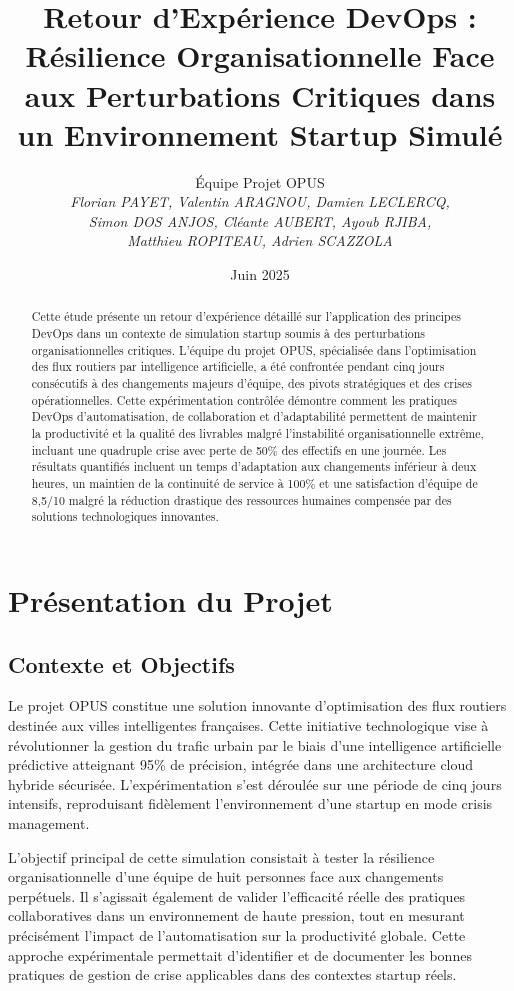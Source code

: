 \documentclass[12pt,a4paper]{article}
\title{Retour d'Expérience DevOps : Résilience Organisationnelle Face aux Perturbations Critiques dans un Environnement Startup Simulé}
\author{
Équipe Projet OPUS \\
\textit{Florian PAYET, Valentin ARAGNOU, Damien LECLERCQ,} \\
\textit{Simon DOS ANJOS, Cléante AUBERT, Ayoub RJIBA,} \\
\textit{Matthieu ROPITEAU, Adrien SCAZZOLA}
}
\date{Juin 2025}
\begin{document}
\maketitle

\begin{abstract}
Cette étude présente un retour d'expérience détaillé sur l'application des principes DevOps dans un contexte de simulation startup soumis à des perturbations organisationnelles critiques. L'équipe du projet OPUS, spécialisée dans l'optimisation des flux routiers par intelligence artificielle, a été confrontée pendant cinq jours consécutifs à des changements majeurs d'équipe, des pivots stratégiques et des crises opérationnelles. Cette expérimentation contrôlée démontre comment les pratiques DevOps d'automatisation, de collaboration et d'adaptabilité permettent de maintenir la productivité et la qualité des livrables malgré l'instabilité organisationnelle extrême, incluant une quadruple crise avec perte de 50\% des effectifs en une journée. Les résultats quantifiés incluent un temps d'adaptation aux changements inférieur à deux heures, un maintien de la continuité de service à 100\% et une satisfaction d'équipe de 8,5/10 malgré la réduction drastique des ressources humaines compensée par des solutions technologiques innovantes.
\end{abstract}

\newpage
\tableofcontents
\newpage

\section{Présentation du Projet}

\subsection{Contexte et Objectifs}

Le projet OPUS constitue une solution innovante d'optimisation des flux routiers destinée aux villes intelligentes françaises. Cette initiative technologique vise à révolutionner la gestion du trafic urbain par le biais d'une intelligence artificielle prédictive atteignant 95\% de précision, intégrée dans une architecture cloud hybride sécurisée. L'expérimentation s'est déroulée sur une période de cinq jours intensifs, reproduisant fidèlement l'environnement d'une startup en mode crisis management.

L'objectif principal de cette simulation consistait à tester la résilience organisationnelle d'une équipe de huit personnes face aux changements perpétuels. Il s'agissait également de valider l'efficacité réelle des pratiques collaboratives dans un environnement de haute pression, tout en mesurant précisément l'impact de l'automatisation sur la productivité globale. Cette approche expérimentale permettait d'identifier et de documenter les bonnes pratiques de gestion de crise applicables dans des contextes startup réels.
\end{document}
